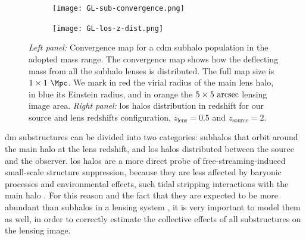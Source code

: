 \begin{figure}
	\centering
	\begin{subfigure}[b]{0.5\linewidth}  
	\centering
	\texttt{[image: GL-sub-convergence.png]}
	\end{subfigure}
	\hfill
	\begin{subfigure}[b]{0.46\linewidth}
	\centering
	\texttt{[image: GL-los-z-dist.png]}
	\end{subfigure} 
	\caption{\textit{Left panel:} Convergence map for a \gls*{cdm} subhalo population in the adopted mass range. The convergence map shows how the deflecting mass from all the subhalo lenses is distributed. The full map size is $1 \times 1\ \si{\Mpc}$. We mark in red the virial radius of the main lens halo, in blue its Einstein radius, and in orange the $5 \times 5\ \si{\arcsec}$ lensing image area. \textit{Right panel: }\gls*{los} halos distribution in redshift for our source and lens redshifts configuration, $z_\mathrm{lens}=0.5$ and $z_\mathrm{source}=2$.}
	\label{fig:sl-substructure}
\end{figure}

\Gls*{dm} substructures can be divided into two categories: subhalos that orbit around the main halo at the lens redshift, and \gls*{los} halos distributed between the source and the observer. \Gls*{los} halos are a more direct probe of free-streaming-induced small-scale structure suppression, because they are less affected by baryonic processes and environmental effects, such tidal stripping interactions with the main halo \cite{Despali:2017ksx}. For this reason and the fact that they are expected to be more abundant than subhalos in a lensing system \cite{Despali:2017ksx, He:2021rjd}, it is very important to model them as well, in order to correctly estimate the collective effects of all substructures on the lensing image. 

